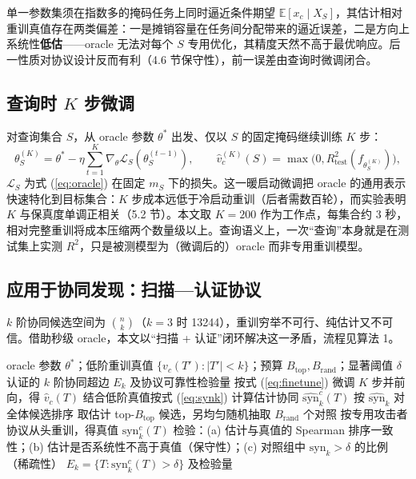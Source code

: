 \documentclass[10.5pt,compsoc,UTF8]{CjC}
\theoremstyle{mystyle}
\begin{document}
单一参数集须在指数多的掩码任务上同时逼近条件期望 $\mathbb{E}[x_c\mid X_S]$，其估计相对重训真值存在两类偏差：一是摊销容量在任务间分配带来的逼近误差，二是方向上系统性\textbf{低估}——oracle 无法对每个 $S$ 专用优化，其精度天然不高于最优响应。后一性质对协议设计反而有利（4.6 节保守性），前一误差由查询时微调闭合。

\subsection{查询时 $K$ 步微调}

对查询集合 $S$，从 oracle 参数 $\theta^{*}$ 出发、仅以 $S$ 的固定掩码继续训练 $K$ 步：
\begin{equation}
\theta_S^{(K)}=\theta^{*}-\eta\sum_{t=1}^{K}\nabla_{\theta}\mathcal{L}_S(\theta_S^{(t-1)}),\qquad
\hat v_c^{(K)}(S)=\max\bigl(0,R^2_{\mathrm{test}}(f_{\theta_S^{(K)}})\bigr),
\label{eq:finetune}
\end{equation}
$\mathcal{L}_S$ 为式 (\ref{eq:oracle}) 在固定 $m_S$ 下的损失。这一暖启动微调把 oracle 的通用表示快速特化到目标集合：$K$ 步成本远低于冷启动重训（后者需数百轮），而实验表明 $K$ 与保真度单调正相关（5.2 节）。本文取 $K=200$ 作为工作点，每集合约 3 秒，相对完整重训将成本压缩两个数量级以上。查询语义上，一次“查询”本身就是在测试集上实测 $R^2$，只是被测模型为（微调后的）oracle 而非专用重训模型。

\subsection{应用于协同发现：扫描—认证协议}

$k$ 阶协同候选空间为 $\binom{n}{k}$（$k=3$ 时 13244），重训穷举不可行、纯估计又不可信。借助秒级 oracle，本文以“扫描 + 认证”闭环解决这一矛盾，流程见算法 1。

\begin{algorithm}[htbp]
\caption{$k$ 阶协同扫描—认证协议}
\label{alg:scan}
\begin{algorithmic}[1]
\Require oracle 参数 $\theta^{*}$；低阶重训真值 $\{v_c(T'):|T'|<k\}$；预算 $B_{\mathrm{top}},B_{\mathrm{rand}}$；显著阈值 $\delta$
\Ensure 认证的 $k$ 阶协同超边 $E_k$ 及协议可靠性检验量
  \State 按式 (\ref{eq:finetune}) 微调 $K$ 步并前向，得 $\hat v_c(T)$
  \State 结合低阶真值按式 (\ref{eq:synk}) 计算估计协同 $\widehat{\mathrm{syn}}_k^c(T)$
\EndFor
\State 按 $\widehat{\mathrm{syn}}_k$ 对全体候选排序
\State 取估计 top-$B_{\mathrm{top}}$ 候选，另均匀随机抽取 $B_{\mathrm{rand}}$ 个对照
  \State 按专用攻击者协议从头重训，得真值 $\mathrm{syn}_k^c(T)$
\EndFor
\State 检验：(a) 估计与真值的 Spearman 排序一致性；(b) 估计是否系统性不高于真值（保守性）；(c) 对照组中 $\mathrm{syn}_k>\delta$ 的比例（稀疏性）
\State \Return $E_k=\{T:\mathrm{syn}_k^c(T)>\delta\}$ 及检验量
\end{algorithmic}
\end{algorithm}
\end{document}
